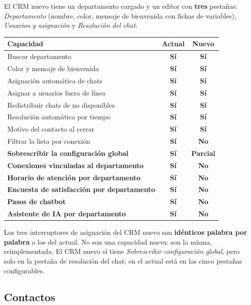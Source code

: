 \documentclass[11pt,a4paper]{article}
\newcommand{\si}{\textcolor{ok}{\textbf{Sí}}}
\newcommand{\no}{\textcolor{warn}{\textbf{No}}}
\newcommand{\parcial}{\textcolor{accent}{\textbf{Parcial}}}
\begin{document}
El CRM nuevo tiene un departamento cargado y un editor con \textbf{tres} pestañas:
\emph{Departamento} (nombre, color, mensaje de bienvenida con fichas de variables),
\emph{Usuarios y asignación} y \emph{Resolución del chat}.

\begin{center}
\begin{tabularx}{\textwidth}{@{}Lcc@{}}
\toprule
\textbf{Capacidad} & \textbf{Actual} & \textbf{Nuevo} \\
\midrule
Buscar departamento                          & \si & \si \\
Color y mensaje de bienvenida                & \si & \si \\
Asignación automática de chats               & \si & \si \\
Asignar a usuarios fuera de línea            & \si & \si \\
Redistribuir chats de no disponibles         & \si & \si \\
Resolución automática por tiempo             & \si & \si \\
Motivo del contacto al cerrar                & \si & \si \\
Filtrar la lista por conexión                & \si & \no \\
\textbf{Sobrescribir la configuración global} & \si & \parcial \\
\textbf{Conexiones vinculadas al departamento} & \si & \no \\
\textbf{Horario de atención por departamento} & \si & \no \\
\textbf{Encuesta de satisfacción por departamento} & \si & \no \\
\textbf{Pasos de chatbot}                    & \si & \no \\
\textbf{Asistente de IA por departamento}    & \si & \no \\
\bottomrule
\end{tabularx}
\end{center}

\begin{nota}
Los tres interruptores de asignación del CRM nuevo son \textbf{idénticos palabra por
palabra} a los del actual. No son una capacidad nueva: son la misma, reimplementada. El
CRM nuevo sí tiene \emph{Sobrescribir configuración global}, pero solo en la pestaña de
resolución del chat; en el actual está en las cinco pestañas configurables.
\end{nota}

\subsection{Contactos}
\end{document}
